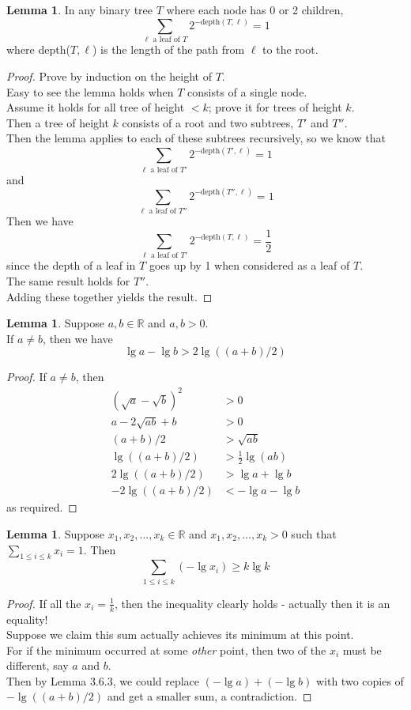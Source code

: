 \documentclass[12pt]{article}
\theoremstyle{plain}
\theoremstyle{definition}
\newtheorem{lemma}[theorem]{Lemma}
\begin{document}
\begin{lemma}
In any binary tree $T$ where each node has 0 or 2 children,
$$\sum_{\ell \text{ a leaf of } T} 2^{-\text{depth}(T, \ell)} = 1$$
where depth($T, \ell$) is the length of the path from $\ell$ to the root.
\end{lemma}
\begin{proof}
Prove by induction on the height of $T$. \\
Easy to see the lemma holds when $T$ consists of a single node. \\
Assume it holds for all tree of height $< k$;
prove it for trees of height $k$. \\
Then a tree of height $k$ consists of a root and two subtrees, $T'$ and $T''$. \\
Then the lemma applies to each of these subtrees recursively, so we know that
$$\sum_{\ell \text{ a leaf of } T'} 2^{-\text{depth}(T', \ell)} = 1$$
and
$$\sum_{\ell \text{ a leaf of } T''} 2^{-\text{depth}(T'', \ell)} = 1$$
Then we have
$$\sum_{\ell \text{ a leaf of } T'} 2^{-\text{depth}(T, \ell)} = \frac{1}{2}$$
since the depth of a leaf in $T$ goes up by 1 when considered as a leaf of $T$. \\
The same result holds for $T''$. \\
Adding these together yields the result.
\end{proof}

\begin{lemma}
Suppose $a, b \in \mathbb{R}$ and $a, b > 0$. \\
If $a \neq b$, then we have
$$\lg a - \lg b > 2\lg((a + b)/2)$$
\end{lemma}
\begin{proof}
If $a \neq b$, then
\begin{align*}
(\sqrt{a} - \sqrt{b})^{2} &> 0 \\
a - 2\sqrt{ab} + b &> 0 \\
(a + b)/2 &> \sqrt{ab} \\
\lg((a + b)/2) &> \frac{1}{2}\lg(ab) \\
2\lg((a + b)/2) &> \lg{a} + \lg{b} \\
-2\lg((a + b)/2) &< -\lg{a} - \lg{b}
\end{align*}
as required.
\end{proof}

\begin{lemma}
Suppose $x_{1}, x_{2}, \dots, x_{k} \in \mathbb{R}$ and $x_{1}, x_{2}, \dots, x_{k} > 0$ such that $\sum_{1 \leq i \leq k}x_{i} = 1$.
Then
$$\sum_{1 \leq i \leq k}(-\lg x_{i}) \geq k\lg k $$
\end{lemma}
\begin{proof}
If all the $x_{i} = \frac{1}{k}$, then the inequality clearly holds - actually then it is an equality! \\
Suppose we claim this sum actually achieves its minimum at this point. \\
For if the minimum occurred at some \emph{other} point, then two of the $x_{i}$ must be different, say $a$ and $b$. \\
Then by Lemma 3.6.3, we could replace $(-\lg{a}) + (-\lg{b})$ with two copies of $-\lg((a + b)/2)$ and get a smaller sum, a contradiction.
\end{proof}
\end{document}

